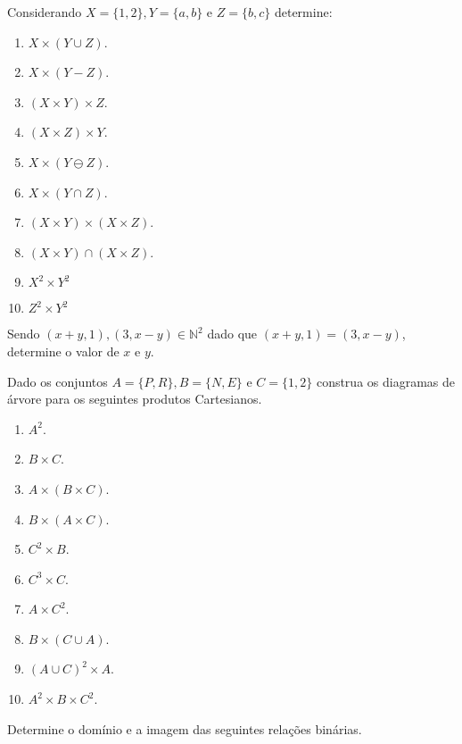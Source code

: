 \begin{exercise}\label{exerc:Relcacoes2}
	Considerando $X = \{1, 2\}, Y = \{a, b\}$ e $Z = \{b, c\}$ determine:
\end{exercise}

\begin{enumerate}
	\item $X  \times (Y \cup Z)$.
	\item $X  \times (Y - Z)$.
	\item $(X \times Y) \times Z$.
	\item $(X \times Z) \times Y$.
	\item $X  \times (Y \ominus Z)$.
	\item $X  \times (Y \cap Z)$.
	\item $(X \times Y) \times (X \times Z)$.
	\item $(X \times Y) \cap (X \times Z)$.
	\item $X^2 \times Y^2$
	\item $Z^2 \times Y^2$
\end{enumerate}

\begin{exercise}\label{exerc:Relcacoes3}
	Sendo $(x + y, 1), (3, x - y) \in \mathbb{N}^2$ dado que $(x + y, 1) = (3, x - y)$, determine o valor de $x$ e $y$.
\end{exercise}

\begin{exercise}\label{exerc:Relcacoes4}
	Dado os conjuntos $A = \{P, R\}, B = \{N, E\}$ e $C = \{1, 2\}$ construa os diagramas de árvore para os seguintes produtos Cartesianos.
\end{exercise}

\begin{enumerate}
	\item $A^2$.
	\item $B \times C$.
	\item $A \times (B \times C)$.
	\item $B \times (A \times C)$.
	\item $C^2 \times B$.
	\item $C^3 \times C$.
	\item $A \times C^2$.
	\item $B \times (C \cup A)$.
	\item $(A \cup C)^2 \times A$.
	\item $A^2 \times B \times C^2$.
\end{enumerate}

\begin{exercise}\label{exerc:Relcacoes5}
	Determine o domínio e a imagem das seguintes relações binárias.
\end{exercise}

